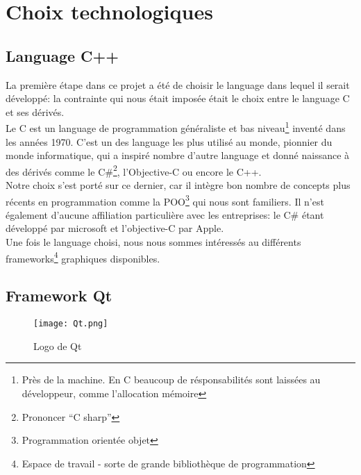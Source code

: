 \chapter{Choix technologiques}
    \section{Language C++}
        La première étape dans ce projet a été de choisir le language dans lequel il serait développé: la contrainte qui nous était imposée 
        était le choix entre le language C et ses dérivés.
        \\ Le C est un language de programmation généraliste et bas niveau\footnote{Près de la machine. En C beaucoup de résponsabilités sont laissées au développeur, comme l'allocation mémoire} inventé dans les années 1970. C'est un des language les plus utilisé 
        au monde, pionnier du monde informatique, qui a inspiré nombre d'autre language et donné naissance à des dérivés comme le C\#\footnote{Prononcer ``C sharp''}, 
        l'Objective-C ou encore le C++.
        \\ Notre choix s'est porté sur ce dernier, car il intègre bon nombre de concepts plus récents en programmation comme la POO\footnote{Programmation
        orientée objet} qui nous sont familiers. Il n'est également d'aucune affiliation particulière avec les entreprises: le C\# étant développé par microsoft
        et l'objective-C par Apple.
        \\ Une fois le language choisi, nous nous sommes intéressés au différents frameworks\footnote{Espace de travail - sorte de grande bibliothèque 
        de programmation}
        graphiques disponibles.


    \section{Framework Qt}
        \begin{figure}[h]
            \begin{center}
                \texttt{[image: Qt.png]}
            \end{center}

            \caption{Logo de Qt}
            \label{Qt}
        \end{figure}

